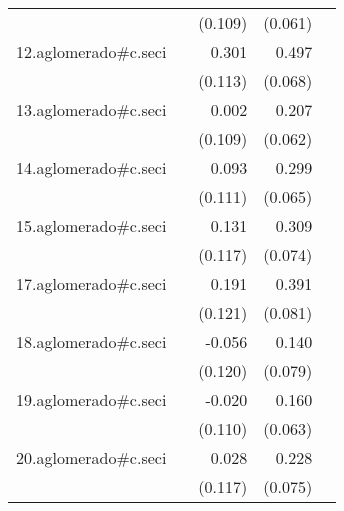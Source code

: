 {\begin{longtable}{l*{4}{D{.}{.}{-1}}}
            &                     &     (0.109)         &     (0.061)         &                     \\
\addlinespace
12.aglomerado#c.seci&                     &       0.301\sym{**} &       0.497\sym{***}&                     \\
            &                     &     (0.113)         &     (0.068)         &                     \\
\addlinespace
13.aglomerado#c.seci&                     &       0.002         &       0.207\sym{***}&                     \\
            &                     &     (0.109)         &     (0.062)         &                     \\
\addlinespace
14.aglomerado#c.seci&                     &       0.093         &       0.299\sym{***}&                     \\
            &                     &     (0.111)         &     (0.065)         &                     \\
\addlinespace
15.aglomerado#c.seci&                     &       0.131         &       0.309\sym{***}&                     \\
            &                     &     (0.117)         &     (0.074)         &                     \\
\addlinespace
17.aglomerado#c.seci&                     &       0.191         &       0.391\sym{***}&                     \\
            &                     &     (0.121)         &     (0.081)         &                     \\
\addlinespace
18.aglomerado#c.seci&                     &      -0.056         &       0.140         &                     \\
            &                     &     (0.120)         &     (0.079)         &                     \\
\addlinespace
19.aglomerado#c.seci&                     &      -0.020         &       0.160\sym{*}  &                     \\
            &                     &     (0.110)         &     (0.063)         &                     \\
\addlinespace
20.aglomerado#c.seci&                     &       0.028         &       0.228\sym{**} &                     \\
            &                     &     (0.117)         &     (0.075)         &                     \\

\end{longtable}}
